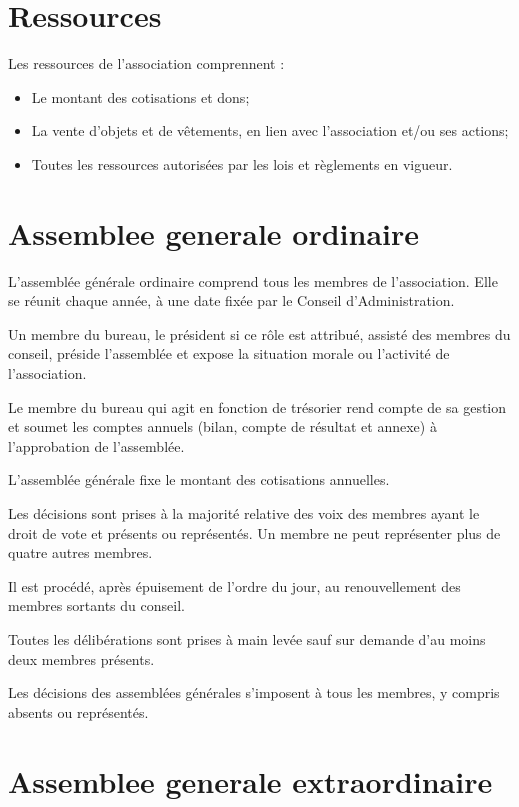 \documentclass[11 pt]{article}
\begin{document}
\section{Ressources}

Les ressources de l'association comprennent :

\begin{itemize}
\item Le montant des cotisations et dons;
\item La vente d'objets et de vêtements, en lien avec l'association
  et/ou ses actions;
\item Toutes les ressources autorisées par les lois et règlements en
  vigueur.
\end{itemize}


\section{Assemblee generale ordinaire}

L'assemblée générale ordinaire comprend tous les membres de
l'association. Elle se réunit chaque année, à une date fixée par le
Conseil d'Administration.

Un membre du bureau, le président si ce rôle est attribué, assisté des
membres du conseil, préside l'assemblée et expose la situation morale
ou l’activité de l'association.

Le membre du bureau qui agit en fonction de trésorier rend compte de
sa gestion et soumet les comptes annuels (bilan, compte de résultat et
annexe) à l'approbation de l'assemblée.

L’assemblée générale fixe le montant des cotisations annuelles.

Les décisions sont prises à la majorité relative des voix des membres
ayant le droit de vote et présents ou représentés. Un membre ne peut
représenter plus de quatre autres membres.

Il est procédé, après épuisement de l'ordre du jour, au renouvellement
des membres sortants du conseil.

Toutes les délibérations sont prises à main levée sauf sur demande
d'au moins deux membres présents.

Les décisions des assemblées générales s’imposent à tous les membres,
y compris absents ou représentés.


\section{Assemblee generale extraordinaire}
\end{document}
